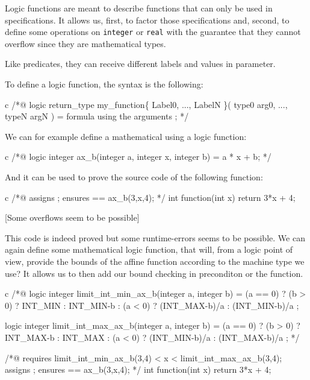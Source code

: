 Logic functions are meant to describe functions that can only be used in
specifications. It allows us, first, to factor those specifications and,
second, to define some operations on \texttt{integer} or \texttt{real}
with the guarantee that they cannot overflow since they are mathematical
types.

Like predicates, they can receive different labels and values in
parameter.





To define a logic function, the syntax is the following:



\begin{CodeBlock}{c}
/*@
  logic return_type my_function\{ Label0, ..., LabelN \}( type0 arg0, ..., typeN argN ) =
    formula using the arguments ;
*/
\end{CodeBlock}



We can for example define a mathematical  using a logic function:



\begin{CodeBlock}{c}
/*@
  logic integer ax_b(integer a, integer x, integer b) =
    a * x + b;
*/
\end{CodeBlock}



And it can be used to prove the source code of the following function:



\begin{CodeBlock}{c}
/*@ 
  assigns \nothing ;
  ensures \result == ax_b(3,x,4); 
*/
int function(int x){
  return 3*x + 4;
}
\end{CodeBlock}



[Some overflows seem to be possible]


This code is indeed proved but some runtime-errors seems to be possible.
We can again define some mathematical logic function, that will, from a
logic point of view, provide the bounds of the affine function according
to the machine type we use? It allows us to then add our bound checking
in preconditon or the function.


\begin{CodeBlock}{c}
/*@
  logic integer limit_int_min_ax_b(integer a, integer b) =
    (a == 0) ? (b > 0) ? INT_MIN : INT_MIN-b :
    (a <  0) ? (INT_MAX-b)/a :
               (INT_MIN-b)/a ;

  logic integer limit_int_max_ax_b(integer a, integer b) =
    (a == 0) ? (b > 0) ? INT_MAX-b : INT_MAX :
    (a <  0) ? (INT_MIN-b)/a :
               (INT_MAX-b)/a ;
*/

/*@
  requires limit_int_min_ax_b(3,4) < x < limit_int_max_ax_b(3,4);
  assigns \nothing ;
  ensures \result == ax_b(3,x,4);
*/
int function(int x){
  return 3*x + 4;
}
\end{CodeBlock}



